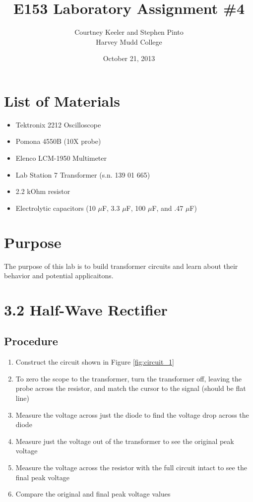 \documentclass[12pt,letterpaper]{report}
\begin{document}
\title{E153 Laboratory Assignment \#4}
\author{Courtney Keeler and Stephen Pinto\\
Harvey Mudd College}
\date{October 21, 2013}
\maketitle

\section*{List of Materials}
\begin{itemize}
	\item Tektronix 2212 Oscilloscope
	\item Pomona 4550B (10X probe)
	\item Elenco LCM-1950 Multimeter
	\item Lab Station 7 Transformer (s.n. 139 01 665)
	\item 2.2 kOhm resistor
	\item Electrolytic capacitors (10 $\mu$F, 3.3 $\mu$F, 100 $\mu$F, and .47 $\mu$F)
\end{itemize}

\section*{Purpose}
The purpose of this lab is to build transformer circuits and learn about their behavior and potential applicaitons.

\section*{3.2 Half-Wave Rectifier}
\subsection*{Procedure}

\begin{enumerate}
\item Construct the circuit shown in Figure \ref{fig:circuit_1}
\item To zero the scope to the transformer, turn the transformer off, leaving the probe across the resistor, and match the cursor to the signal (should be flat line)
\item Measure the voltage across just the diode to find the voltage drop across the diode
\item Measure just the voltage out of the transformer to see the original peak voltage
\item Measure the voltage across the resistor with the full circuit intact to see the final peak voltage
\item Compare the original and final peak voltage values
\end{enumerate}
\end{document}
